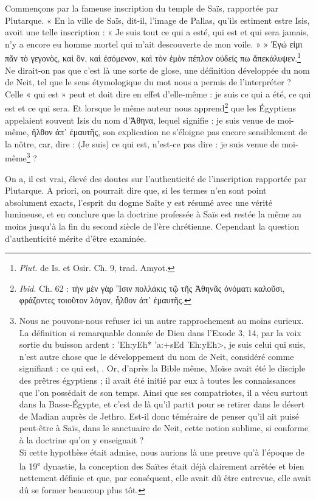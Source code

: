 \documentclass[a4paper, 11pt, oneside]{article}
\newcommand*\hieroAAAQ{}
\begin{document}
Commençons par la fameuse inscription du temple de Saïs, rapportée par Plutarque. « En la ville de Saïs, dit-il, l'image de Pallas, qu'ils estiment estre Isis, avoit une telle inscription : « Je suis tout ce qui a esté, qui est et qui sera jamais, n'y a encore eu homme mortel qui m'ait descouverte de mon voile. » » Ἐγώ εἰμι πᾶν τὸ γεγονὸς, καὶ ὃν, καὶ ἐσόμενον, καὶ τὸν ἐμὸν πέπλον οὐδείς πω ἄπεκάλυψεν.\footnote{\emph{Plut.} de Is. et Osir. Ch. 9, trad. Amyot.} Ne dirait-on pas que c'est là une sorte de glose, une définition développée du nom de Neit, tel que le sens étymologique du mot nous a permis de l'interpréter ? Celle « qui est » peut et doit dire en effet d'elle-même : je suis ce qui a été, ce qui est et ce qui sera. Et lorsque le même auteur nous apprend\footnote{\emph{Ibid.} Ch. 62 : τὴν μὲν γὰρ Ἲσιν πολλάκις τῷ τῆς Ἀθηνᾶς ὀνόματι καλοῦσι, φράζοντες τοιοῦτον λόγον, ἦλθον ἀπ᾿ ἐμαυτῆς.} que les Égyptiens appelaient souvent Isis du nom d'Ἀθηνα, lequel signifie : je suis venue de moi-même, ἤλθον ἀπ᾽ ἐμαυτῆς, son explication ne s'éloigne pas encore sensiblement de la nôtre, car, dire : (Je suis) ce qui est, n'est-ce pas dire : je suis venue de moi-même\footnote{Nous ne pouvons-nous refuser ici un autre rapprochement au moins curieux. La définition si remarquable donnée de Dieu dans l'Exode 3, 14, par la voix sortie du buisson ardent : \foreignlanguage{hebrew}{\<'Eh:yEh* 'a:+sEd 'Eh:yEh>}, je suis celui qui suis, n'est autre chose que le développement du nom de Neit, considéré comme signifiant : ce qui est, $\hieroAAAQ$. Or, d'après la Bible même, Moïse avait été le disciple des prêtres égyptiens ; il avait été initié par eux à toutes les connaissances que l'on possédait de son temps. Ainsi que ses compatriotes, il a vécu surtout dans la Basse-Égypte, et c'est de là qu'il partit pour se retirer dans le désert de Madian auprès de Jethro. Est-il donc téméraire de penser qu'il ait puisé peut-être à Saïs, dans le sanctuaire de Neit, cette notion sublime, si conforme à la doctrine qu'on y enseignait ?\\\hspace*{5mm}Si cette hypothèse était admise, nous aurions là une preuve qu'à l'époque de la 19\textsuperscript{e} dynastie, la conception des Saïtes était déjà clairement arrêtée et bien nettement définie et que, par conséquent, elle avait dû être entrevue, elle avait dû se former beaucoup plus tôt.} ?

On a, il est vrai, élevé des doutes sur l'authenticité de l'inscription rapportée par Plutarque. A priori, on pourrait dire que, si les termes n'en sont point absolument exacts, l'esprit du dogme Saïte y est résumé avec une vérité lumineuse, et en conclure que la doctrine professée à Saïs est restée la même au moins jusqu'à la fin du second siècle de l'ère chrétienne. Cependant la question d'authenticité mérite d'être examinée.
\end{document}
